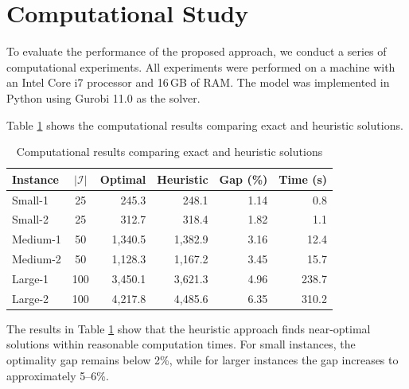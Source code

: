 \documentclass[11pt,a4paper]{article}
\begin{document}
\section{Computational Study}
\label{sec:computational}
To evaluate the performance of the proposed approach, we conduct a series of computational experiments. All experiments were performed on a machine with an Intel Core i7 processor and 16\,GB of RAM. The model was implemented in Python using Gurobi 11.0 as the solver.

Table \ref{tab:results} shows the computational results comparing exact and heuristic solutions.
\begin{table}[H]
	\centering
	\caption{Computational results comparing exact and heuristic solutions}
	\label{tab:results}
	\begin{tabular}{lcrrrr}
		\toprule
		Instance & $|\mathcal{I}|$ & Optimal & Heuristic & Gap (\%) & Time (s)\\
		\midrule
		Small-1  & 25  &   245.3 &   248.1 & 1.14 &    0.8\\
		Small-2  & 25  &   312.7 &   318.4 & 1.82 &    1.1\\
		Medium-1 & 50  & 1,340.5 & 1,382.9 & 3.16 &   12.4\\
		Medium-2 & 50  & 1,128.3 & 1,167.2 & 3.45 &   15.7\\
		Large-1  & 100 & 3,450.1 & 3,621.3 & 4.96 &  238.7\\
		Large-2  & 100 & 4,217.8 & 4,485.6 & 6.35 &  310.2\\
		\bottomrule
	\end{tabular}
\end{table}

The results in Table \ref{tab:results} show that the heuristic approach finds near-optimal solutions within reasonable computation times. For small instances, the optimality gap remains below 2\%, while for larger instances the gap increases to approximately 5--6\%.

\end{document}
